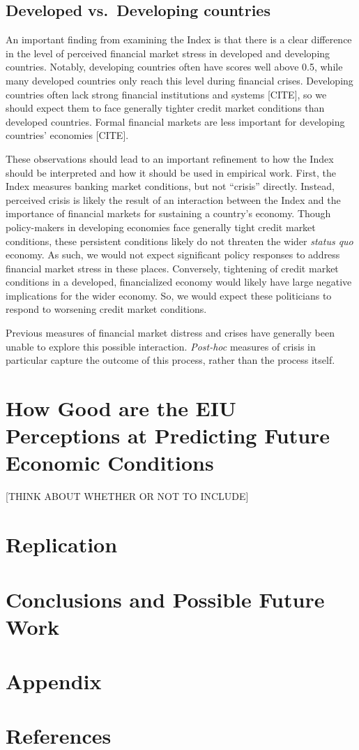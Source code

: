 \documentclass[]{article}
\begin{document}
\subsection{Developed vs.~Developing
countries}\label{developed-vs.developing-countries}

An important finding from examining the Index is that there is a clear
difference in the level of perceived financial market stress in
developed and developing countries. Notably, developing countries often
have scores well above 0.5, while many developed countries only reach
this level during financial crises. Developing countries often lack
strong financial institutions and systems {[}CITE{]}, so we should
expect them to face generally tighter credit market conditions than
developed countries. Formal financial markets are less important for
developing countries' economies {[}CITE{]}.

These observations should lead to an important refinement to how the
Index should be interpreted and how it should be used in empirical work.
First, the Index measures banking market conditions, but not ``crisis''
directly. Instead, perceived crisis is likely the result of an
interaction between the Index and the importance of financial markets
for sustaining a country's economy. Though policy-makers in developing
economies face generally tight credit market conditions, these
persistent conditions likely do not threaten the wider \emph{status quo}
economy. As such, we would not expect significant policy responses to
address financial market stress in these places. Conversely, tightening
of credit market conditions in a developed, financialized economy would
likely have large negative implications for the wider economy. So, we
would expect these politicians to respond to worsening credit market
conditions.

Previous measures of financial market distress and crises have generally
been unable to explore this possible interaction. \emph{Post-hoc}
measures of crisis in particular capture the outcome of this process,
rather than the process itself.

\section{How Good are the EIU Perceptions at Predicting Future Economic
Conditions}

{[}THINK ABOUT WHETHER OR NOT TO INCLUDE{]}

\section{Replication}\label{replication}

\section{Conclusions and Possible Future
Work}\label{conclusions-and-possible-future-work}

\section*{Appendix}\label{appendix}

\section*{References}\label{references}



\end{document}
